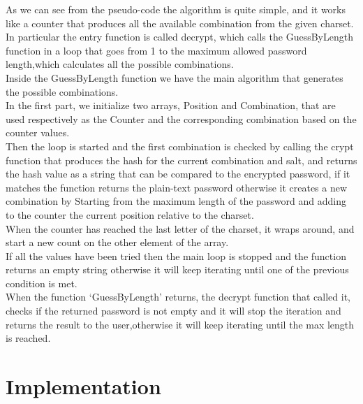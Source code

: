 \documentclass[10pt,twocolumn,letterpaper]{article}
\begin{document}
As we can see from the pseudo-code the algorithm is quite simple, and it works like a counter that produces all the available 
combination from the given charset.\\
In particular the entry function is called decrypt, which calls the GuessByLength function in a loop that goes from 1 to the maximum 
allowed password length,which calculates all the possible combinations.\\
Inside the GuessByLength function we have the main algorithm that generates the possible combinations.\\
In the first part, we initialize two arrays, Position and Combination, that are used respectively as the Counter and the corresponding
combination based on the counter values.\\
Then the loop is started and the first combination is checked by calling the crypt function that produces the hash for the current 
combination and salt, and returns the hash value as a string that can be compared to the encrypted password, if it matches the function
returns the plain-text password otherwise it creates a new combination by Starting from the maximum length of the password and adding to
the counter the current position relative to the charset.\\
When the counter has reached the last letter of the charset, it wraps around, and start a new count on the other element of the array.\\
If all the values have been tried then the main loop is stopped and the function returns an empty string otherwise it will keep 
iterating until one of the previous condition is met.\\
When the function `GuessByLength' returns, the decrypt function that called it, checks if the returned password is not empty and it will 
stop the iteration and returns the result to the user,otherwise it will keep iterating until the max length is reached.\\

\section{Implementation}
\end{document}
